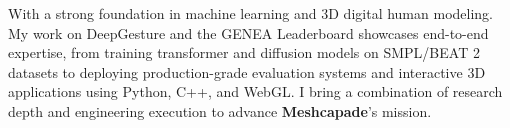 \begin{onecolentry}
With a strong foundation in machine learning and 3D digital human modeling. My work on DeepGesture and the GENEA Leaderboard showcases end-to-end expertise, from training transformer and diffusion models on SMPL/BEAT 2 datasets to deploying production-grade evaluation systems and interactive 3D applications using Python, C++, and WebGL. I bring a combination of research depth and engineering execution to advance \textbf{Meshcapade}’s mission.
\end{onecolentry}
